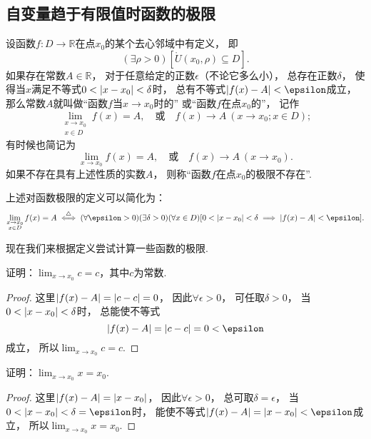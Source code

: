 \subsection{自变量趋于有限值时函数的极限}
\begin{definition}\label{definition:极限.函数极限的定义1}
设函数\(f\colon D\to\mathbb{R}\)在点\(x_0\)的某个去心邻域中有定义，
即\[
	(\exists\rho>0)
	[\mathring{U}(x_0,\rho) \subseteq D].
\]
如果存在常数\(A\in\mathbb{R}\)，
对于任意给定的正数\(\epsilon\)（不论它多么小），
总存在正数\(\delta\)，
使得当\(x\)满足不等式\(0 < \abs{x-x_0} < \delta\)时，
总有不等式\(\abs{f(x)-A}<\epsilon\)成立，
那么常数\(A\)就叫做“函数\(f\)当\(x \to x_0\)时的”
或“函数\(f\)在点\(x_0\)的”，
记作\[
	\lim_{\substack{x \to x_0 \\ x \in D}} f(x) = A,
	\quad\text{或}\quad
	f(x) \to A\ (x \to x_0; x \in D);
\]
有时候也简记为\[
	\lim_{x \to x_0} f(x) = A,
	\quad\text{或}\quad
	f(x) \to A\ (x \to x_0).
\]
如果不存在具有上述性质的实数\(A\)，
则称“函数\(f\)在点\(x_0\)的极限不存在”.
\end{definition}

上述对函数极限的定义可以简化为：\[
	\lim_{\substack{x \to x_0 \\ x \in D}} f(x) = A
	\defiff
	(\forall \epsilon > 0)
	(\exists \delta > 0)
	(\forall x \in D)
	[0 < \abs{x - x_0} < \delta \implies \abs{f(x) - A} < \epsilon].
\]

现在我们来根据定义尝试计算一些函数的极限.

\begin{example}
证明：\(\lim_{x \to x_0} c = c\)，其中\(c\)为常数.
\begin{proof}
这里\(\abs{f(x) - A} = \abs{c - c} = 0\)，
因此\(\forall \epsilon > 0\)，
可任取\(\delta > 0\)，
当\(0 < \abs{x - x_0} < \delta\)时，
总能使不等式\[
	\abs{f(x) - A} = \abs{c - c} = 0 < \epsilon
\]成立，
所以\(\lim_{x \to x_0} c = c\).
\end{proof}
\end{example}

\begin{example}
证明：\(\lim_{x \to x_0} x = x_0\).
\begin{proof}
这里\(\abs{f(x) - A} = \abs{x - x_0}\)，
因此\(\forall \epsilon > 0\)，
总可取\(\delta = \epsilon\)，
当\(0 < \abs{x - x_0} < \delta = \epsilon\)时，
能使不等式\(\abs{f(x) - A} = \abs{x - x_0} < \epsilon\)成立，
所以\(\lim_{x \to x_0} x = x_0\).
\end{proof}
\end{example}

